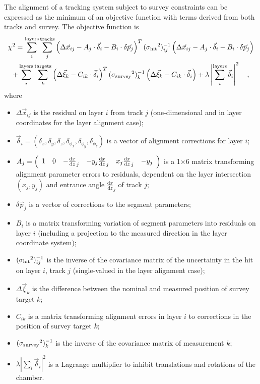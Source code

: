 \documentclass[11pt,twoside,a4paper,cmspaper]{cms-tdr}
\begin{document}
The alignment of a tracking system subject to survey constraints can
be expressed as the minimum of an objective function with terms
derived from both tracks and survey.  The objective function is
\begin{multline}
\chi^2 = \sum_i^{\mbox{\scriptsize layers}} \sum_j^{\mbox{\scriptsize tracks}}
\left(\Delta \vec{x}_{ij} - A_j \cdot \vec{\delta}_i - B_i \cdot \delta \vec{p}_j\right)^T
({\sigma_{\mbox{\scriptsize hit}}}^2)_{ij}^{-1} \left(\Delta \vec{x}_{ij} - A_j \cdot \vec{\delta}_i - B_i \cdot \delta \vec{p}_j\right) \\
+ \sum_i^{\mbox{\scriptsize layers}} \sum_k^{\mbox{\scriptsize targets}}
\left(\Delta \vec{\xi}_k - C_{ik} \cdot \vec{\delta}_i\right)^T
({\sigma_{\mbox{\scriptsize survey}}}^2)_k^{-1}
\left(\Delta \vec{\xi}_k - C_{ik} \cdot \vec{\delta}_i\right)
+ \lambda \left|\sum_i^{\mbox{\scriptsize layers}} \vec{\delta}_i\right|^2 \quad\mbox{,}
\label{eqn:chi2millepede}
\end{multline}
where
\begin{itemize}
\item $\Delta \vec{x}_{ij}$ is the residual on layer $i$ from track $j$ (one-dimensional and in layer coordinates for the layer alignment case);
\item $\vec{\delta}_i =
(\delta_x, \delta_y, \delta_z, \delta_{\phi_x}, \delta_{\phi_y}, \delta_{\phi_z})$ is a vector of alignment corrections for layer $i$;
\item $A_j = \left(\begin{array}{c c c c c c} 1 & 0 & -\frac{\textrm{d}x}{\textrm{d}z}_j & -y_j \frac{\textrm{d}x}{\textrm{d}z}_j & x_j \frac{\textrm{d}x}{\textrm{d}z}_j & -y_j \end{array}\right)$ is a 1$\times$6 matrix transforming alignment parameter errors to residuals, dependent on the layer intersection $(x_j, y_j)$ and entrance angle $\frac{\textrm{d}x}{\textrm{d}z}_j$ of track $j$;
\item $\delta \vec{p}_j$ is a vector of corrections to the segment parameters;
\item $B_i$ is a matrix transforming variation of segment parameters
into residuals on layer $i$ (including a projection to the measured direction in the layer coordinate system);
\item $({\sigma_{\mbox{\scriptsize hit}}}^2)_{ij}^{-1}$ is the inverse
of the covariance matrix of the uncertainty in the hit on layer $i$,
track $j$ (single-valued in the layer alignment case);
\item $\Delta \vec{\xi}_k$ is the difference between the nominal and
measured position of survey target $k$;
\item $C_{ik}$ is a matrix transforming alignment errors in layer $i$ to corrections in the position of survey target $k$;
\item $({\sigma_{\mbox{\scriptsize survey}}}^2)_k^{-1}$ is the inverse
of the covariance matrix of measurement $k$;
\item $\lambda \left| \sum_i \vec{\delta}_i \right|^2$ is a Lagrange multiplier to inhibit translations
and rotations of the chamber.
\end{itemize}
\end{document}
